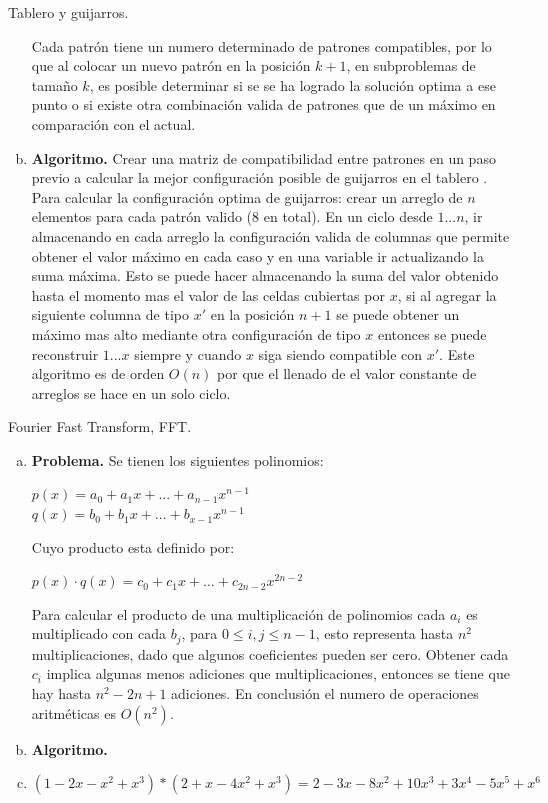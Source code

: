 \documentclass[12pt,a4paper]{article}
\begin{document}
\begin{section}{Tablero y guijarros.}
\begin{enumerate}[a., nolistsep, font=\bfseries]
Cada patrón tiene un numero determinado de patrones compatibles, por lo que al colocar un nuevo patrón en la posición $k+1$, en subproblemas de tamaño $k$, es posible determinar si se se ha logrado la solución optima a ese punto o si existe otra combinación valida de patrones que de un máximo en comparación con el actual.\\

\item \textbf{Algoritmo.} Crear una matriz de compatibilidad entre patrones en un paso previo a calcular la mejor configuración posible de guijarros en el tablero . Para calcular la configuración optima de guijarros: crear un arreglo de $n$ elementos para cada patrón valido (8 en total). En un ciclo desde $1 ... n$, ir almacenando en cada arreglo la configuración valida de columnas que permite obtener el valor máximo en cada caso y en una variable ir actualizando la suma máxima. Esto se puede hacer almacenando la suma del valor obtenido hasta el momento mas el valor de las celdas cubiertas por $x$, si al agregar la siguiente columna de tipo $x'$ en la posición $n+1$ se puede obtener un máximo mas alto mediante otra configuración de tipo $x$ entonces se puede reconstruir $1...x$ siempre y cuando $x$ siga siendo compatible con $x'$. Este algoritmo es de orden $O(n)$ por que el llenado de el valor constante de arreglos se hace en un solo ciclo.  
\end{enumerate}
\end{section}
\newpage

\begin{section}{Fourier Fast Transform, FFT.} \noindent 
\begin{enumerate}[a., font=\bfseries]
\item \textbf{Problema.} Se tienen los siguientes polinomios:
\begin{center}
$p(x)=a_0+a_1x+...+a_{n-1}x^{n-1}$\\
\vspace{1em}
$q(x)=b_0+b_1x+...+b_{x-1}x^{n-1}$
\end{center}
Cuyo producto esta definido por:
\begin{center}
$p(x)\cdot q(x) = c_0+c_1x+...+c_{2n-2}x^{2n-2}$
\end{center}
Para calcular el producto de una multiplicación de polinomios cada $a_i$ es multiplicado con cada $b_j$, para $0\leq i,j \leq n-1$, esto representa hasta $n^2$ multiplicaciones, dado que algunos coeficientes pueden ser cero. Obtener cada $c_i$ implica algunas menos adiciones que multiplicaciones, entonces se tiene que hay hasta $n^2 - 2n+1$ adiciones. En conclusión el numero de operaciones aritméticas es $O(n^2)$. \cite{jia2014polynomial}
\item \textbf{Algoritmo.}
\item \textbf{$(1-2x-x^2+x^3)*(2+x-4x^2+x^3)=2-3x-8x^2+10x^3+3x^4-5x^5+x^6$}
\end{enumerate}
\end{section}

\newpage
\nocite{*}


\end{document}
